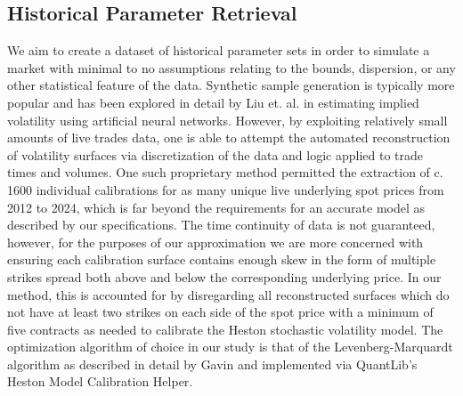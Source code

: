 \documentclass[11pt]{article}
\begin{document}
	\subsection{Historical Parameter Retrieval}
		We aim to create a dataset of historical parameter sets in order to simulate a market with minimal to no assumptions relating to the bounds, dispersion, or any other statistical feature of the data. Synthetic sample generation is typically more popular and has been explored in detail by Liu et. al. \cite{liu_2019_pricing} in estimating implied volatility using artificial neural networks. However, by exploiting relatively small amounts of live trades data, one is able to attempt the automated reconstruction of volatility surfaces via discretization of the data and logic applied to trade times and volumes. One such proprietary method permitted the extraction of c. 1600 individual calibrations for as many unique live underlying spot prices from 2012 to 2024, which is far beyond the requirements for an accurate model as described by our specifications. The time continuity of data is not guaranteed, however, for the purposes of our approximation we are more concerned with ensuring each calibration surface contains enough skew in the form of multiple strikes spread both above and below the corresponding underlying price. In our method, this is accounted for by disregarding all reconstructed surfaces which do not have at least two strikes on each side of the spot price with a minimum of five contracts as needed to calibrate the Heston \cite{heston_1993_a} stochastic volatility model. The optimization algorithm of choice in our study is that of the Levenberg-Marquardt algorithm as described in detail by Gavin \cite{gavin_2024_the} and implemented via QuantLib's Heston Model Calibration Helper.
\end{document}
